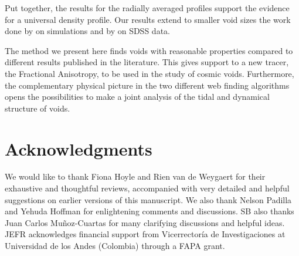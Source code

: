 \documentclass[a4,useAMS,usenatbib,usegraphicx]{mn2e}
\begin{document}
Put together, the results for the radially averaged profiles support the 
evidence for a universal density profile.  
Our results extend to smaller void sizes the work done by
\cite{Hamaus14} on simulations and by \cite{Ceccarelli13} on SDSS data.  


The method we present here finds voids with reasonable properties
compared to different results published in the literature. 
This gives support to a new tracer, the Fractional Anisotropy, to be
used in the study of cosmic voids. 
Furthermore, the complementary physical picture in the two different
web finding algorithms opens the possibilities to make a joint
analysis of the tidal and dynamical structure of voids. 


\section*{Acknowledgments}  


We would like to thank Fiona Hoyle and Rien van de Weygaert for their
exhaustive and thoughtful reviews, accompanied with very detailed and
helpful suggestions on earlier versions of this manuscript.  
We also thank Nelson Padilla and Yehuda Hoffman for enlightening
comments and discussions.
SB also thanks Juan Carlos Mu\~noz-Cuartas 
for many clarifying discussions and helpful ideas.
JEFR acknowledges financial support from Vicerrector\'ia de
Investigaciones at Universidad de los Andes (Colombia) through a FAPA
grant. 
\end{document}
